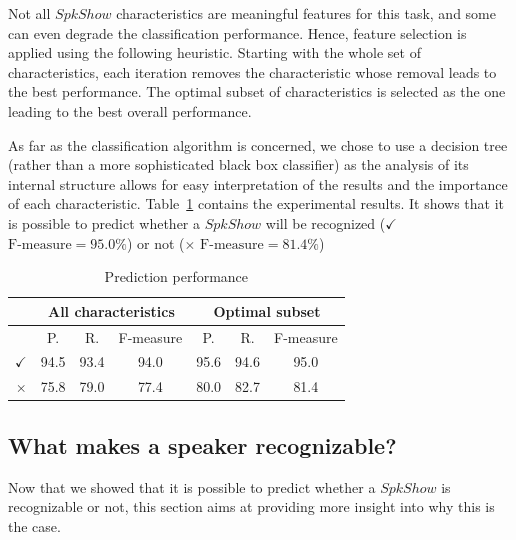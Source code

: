 Not all $SpkShow$ characteristics are meaningful features for this task, and some can even degrade the classification performance. 
Hence, feature selection is applied using the following heuristic.
Starting with the whole set of characteristics, each iteration removes the characteristic whose removal leads to the best performance.
The optimal subset of characteristics is selected as the one leading to the best overall performance.

As far as the classification algorithm is concerned, we chose to use a decision tree (rather than a more sophisticated black box classifier) as the analysis of its internal structure allows for easy interpretation of the results and the importance of each characteristic.
Table~\ref{tableresult} contains the experimental results. It shows that it is possible to predict whether a $SpkShow$ will be recognized ($\checkmark$ $\text{F-measure} = 95.0\%$) or not ($\times$ $\text{F-measure} = 81.4\%$)
\begin{table}[t]
\begin{center}
\begin{tabular}{|r|c|c|c|c|c|c|}
\hline
& \multicolumn{3}{c|}{All characteristics} & \multicolumn{3}{c|}{Optimal subset} \\
\hline
& P. & R. & F-measure & P. & R. & F-measure \\
\hline
$\checkmark$ & 94.5 & 93.4 & 94.0 & 95.6 & 94.6 & 95.0 \\
\hline
$\times$ & 75.8 & 79.0 & 77.4 & 80.0 & 82.7 & 81.4 \\
\hline
\end{tabular}
\caption{Prediction performance}
\label{tableresult}
\end{center}
\end{table}

\subsection{What makes a speaker recognizable?}

Now that we showed that it is possible to predict whether a $SpkShow$ is recognizable or not, this section aims at providing more insight into why this is the case.

